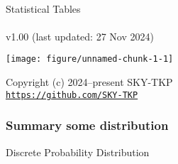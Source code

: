 \documentclass[
]{article}
\author{}
\date{\vspace{-2.5em}}
\begin{document}
\thispagestyle{empty}
\begin{center}
~\\
\vspace{2cm}
{\Huge Statistical Tables}
~\\~\\
v1.00 (last updated: 27 Nov 2024)
\vspace{5cm}
\end{center}

\begin{center}\texttt{[image: figure/unnamed-chunk-1-1]} \end{center}

\vfill
\begin{center}
Copyright (c) 2024--present SKY-TKP
~\\
\href{https://github.com/SKY-TKP}{\texttt{https://github.com/SKY-TKP}}
\end{center}

\newpage

\subsubsection{Summary some
distribution}\label{summary-some-distribution}

Discrete Probability Distribution
\end{document}
